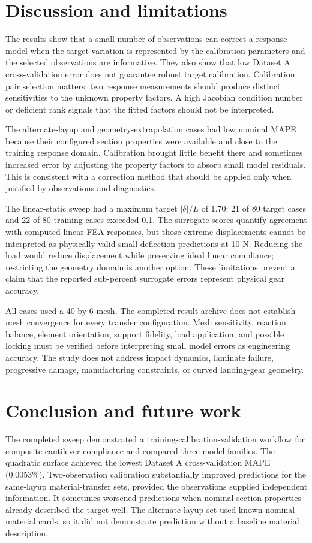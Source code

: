 \documentclass[11pt]{article}
\begin{document}
\section{Discussion and limitations}
The results show that a small number of observations can correct a response model when the target variation is represented by the calibration parameters and the selected observations are informative. They also show that low Dataset A cross-validation error does not guarantee robust target calibration. Calibration pair selection matters: two response measurements should produce distinct sensitivities to the unknown property factors. A high Jacobian condition number or deficient rank signals that the fitted factors should not be interpreted.

The alternate-layup and geometry-extrapolation cases had low nominal MAPE because their configured section properties were available and close to the training response domain. Calibration brought little benefit there and sometimes increased error by adjusting the property factors to absorb small model residuals. This is consistent with a correction method that should be applied only when justified by observations and diagnostics.

The linear-static sweep had a maximum target $|\delta|/L$ of 1.70; 21 of 80 target cases and 22 of 80 training cases exceeded 0.1. The surrogate scores quantify agreement with computed linear FEA responses, but those extreme displacements cannot be interpreted as physically valid small-deflection predictions at 10 N. Reducing the load would reduce displacement while preserving ideal linear compliance; restricting the geometry domain is another option. These limitations prevent a claim that the reported sub-percent surrogate errors represent physical gear accuracy.

All cases used a 40 by 6 mesh. The completed result archive does not establish mesh convergence for every transfer configuration. Mesh sensitivity, reaction balance, element orientation, support fidelity, load application, and possible locking must be verified before interpreting small model errors as engineering accuracy. The study does not address impact dynamics, laminate failure, progressive damage, manufacturing constraints, or curved landing-gear geometry.

\section{Conclusion and future work}
The completed sweep demonstrated a training-calibration-validation workflow for composite cantilever compliance and compared three model families. The quadratic surface achieved the lowest Dataset A cross-validation MAPE (0.0053\%). Two-observation calibration substantially improved predictions for the same-layup material-transfer sets, provided the observations supplied independent information. It sometimes worsened predictions when nominal section properties already described the target well. The alternate-layup set used known nominal material cards, so it did not demonstrate prediction without a baseline material description.
\end{document}
